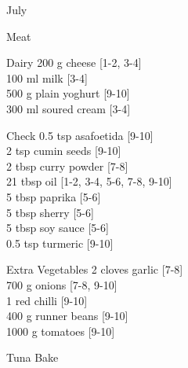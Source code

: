 \begin{menu}{July}
\begin{shoppinglist}{Meat}
      \end{shoppinglist}%
      \begin{shoppinglist}{Dairy}
      200 g cheese 
        {\scriptsize[1-2, 3-4]}\\
      100 ml milk 
        {\scriptsize[3-4]}\\
      500 g plain yoghurt 
        {\scriptsize[9-10]}\\
      300 ml soured cream 
        {\scriptsize[3-4]}\\
      \end{shoppinglist}%
      \par\vfil %
      \vfil\clearpage %
      \begin{shoppinglist}{Check}
      0.5 tsp asafoetida 
        {\scriptsize[9-10]}\\
      2 tsp cumin seeds 
        {\scriptsize[9-10]}\\
      2 tbsp curry powder 
        {\scriptsize[7-8]}\\
      21 tbsp oil 
        {\scriptsize[1-2, 3-4, 5-6, 7-8, 9-10]}\\
      5 tbsp paprika 
        {\scriptsize[5-6]}\\
      5 tbsp sherry 
        {\scriptsize[5-6]}\\
      5 tbsp soy sauce 
        {\scriptsize[5-6]}\\
      0.5 tsp turmeric 
        {\scriptsize[9-10]}\\
      \end{shoppinglist}%
      \begin{shoppinglist}{Extra Vegetables}
      2 cloves garlic 
        {\scriptsize[7-8]}\\
      700 g onions 
        {\scriptsize[7-8, 9-10]}\\
      1  red chilli 
        {\scriptsize[9-10]}\\
      400 g runner beans 
        {\scriptsize[9-10]}\\
      1000 g tomatoes 
        {\scriptsize[9-10]}\\
      \end{shoppinglist}%
      \par\vfil %
    \vfil\clearpage
  
    \begin{recipe}{2}{Tuna Bake}%
    

\end{recipe}
\end{menu}
